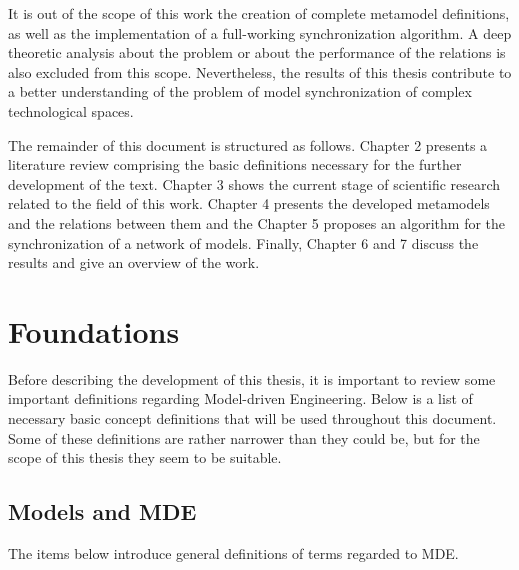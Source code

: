 \documentclass[tuberlin,cic,tc,english,noabntcite, oneside]{iiufrgs}
\begin{document}
It is out of the scope of this work the creation of complete metamodel definitions, as well as the implementation of a full-working synchronization algorithm. A deep theoretic analysis about the problem or about the performance of the relations is also excluded from this scope. Nevertheless, the results of this thesis contribute to a better understanding of the problem of model synchronization of complex technological spaces.

The remainder of this document is structured as follows. Chapter 2 presents a literature review comprising the basic definitions necessary for the further development of the text. Chapter 3 shows the current stage of scientific research related to the field of this work. Chapter 4 presents the developed metamodels and the relations between them and the Chapter 5 proposes an algorithm for the synchronization of a network of models. Finally, Chapter 6 and 7 discuss the results and give an overview of the work.

\chapter{Foundations}
\label{ch:foundations}
Before describing the development of this thesis, it is important to review some important definitions regarding Model-driven Engineering. Below is a list of necessary basic concept definitions that will be used throughout this document. Some of these definitions are rather narrower than they could be, but for the scope of this thesis they seem to be suitable.

\section{Models and MDE}
The items below introduce general definitions of terms regarded to MDE.
\end{document}
